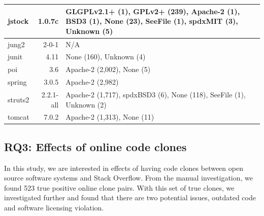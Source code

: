 \documentclass{sig-alternate-05-2015}
\begin{document}
\begin{table}
\begin{tabular}{l|r|p{4cm}}
		jstock & 1.0.7c & GLGPLv2.1+ (1), \newline GPLv2+ (239), \newline Apache-2 (1), BSD3 (1), \newline None (23), SeeFile (1), \newline spdxMIT (3), Unknown (5)\\
		\hline
		jung2 & 2-0-1 & N/A \\
		\hline
		junit & 4.11 & None (160), Unknown (4)  \\
		\hline
		poi & 3.6 & Apache-2 (2,002), None (5) \\
		\hline
		spring & 3.0.5 & Apache-2 (2,982) \\
		\hline
		struts2 & 2.2.1-all & Apache-2 (1,717), \newline spdxBSD3 (6), \newline None (118), SeeFile (1), \newline Unknown (2) \\
		\hline
		tomcat & 7.0.2 & Apache-2 (1,313), None (11) \\
		\hline
	\end{tabular} %
\end{table}


\subsection{RQ3: Effects of online code clones}

In this study, we are interested in effects of having code clones between open source software systems and Stack Overflow. From the manual investigation, we found 523 true positive online clone pairs. With this set of true clones, we investigated further and found that there are two potential issues, outdated code and software licensing violation.
\end{document}
